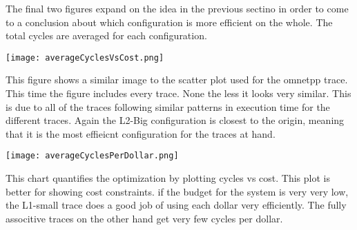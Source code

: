 \documentclass[cacheSimReport.tex]{subfiles}
\begin{document}
\smallskip

The final two figures expand on the idea in the previous sectino in order to come to a conclusion about which configuration is more efficient on the whole. The total cycles are averaged for each configuration.

\hspace{-.9cm}\texttt{[image: averageCyclesVsCost.png]}

This figure shows a similar image to the scatter plot used for the omnetpp trace. This time the figure includes every trace. None the less it looks very similar. This is due to all of the traces following similar patterns in execution time for the different traces. Again the L2-Big configuration is closest to the origin, meaning that it is the most effieicnt configuration for the traces at hand.

\hspace{.9cm}\texttt{[image: averageCyclesPerDollar.png]}

This chart quantifies the optimization by plotting cycles vs cost. This plot is better for showing cost constraints. if the budget for the system is very very low, the L1-small trace does a good job of using each dollar very efficiently. The fully associtive traces on the other hand get very few cycles per dollar.
\end{document}
